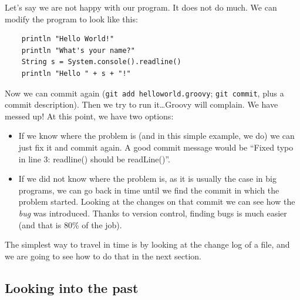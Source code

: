 Let's say we are not happy with our program. It does not do much. We
can modify the program to look like this:

\begin{verbatim}
    println "Hello World!"
    println "What's your name?"
    String s = System.console().readline()
    println "Hello " + s + "!"
\end{verbatim}

Now we can commit again (\verb+git add helloworld.groovy+;
\verb+git commit+, plus a commit description). Then we try to run
it\ldots Groovy will complain. We have messed up! At this point, we
have two options:

\begin{itemize}
\item If we know where the problem is (and in this simple example, we
  do) we can just fix it and commit again. A good commit message would
  be ``Fixed typo in line 3: readline() should be readLine()''.
\item If we did not know where the problem is, as it is usually the
  case in big programs, we can go back in time
  until we find the commit in
  which the problem started. Looking at the changes on that commit we
  can see how the \emph{bug} was introduced. Thanks to version
  control, finding bugs is much easier (and that is 80\% of the job). 
\end{itemize}

The simplest way to travel in time is by looking at the change log of
a file, and we are going to see how to do that in the next section. 

\subsection{Looking into the past}
\label{sec:looking-into-past}

